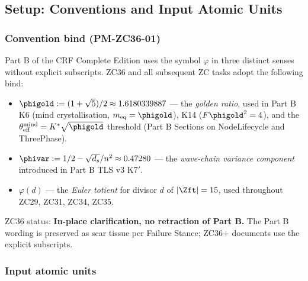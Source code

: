 \documentclass[12pt, a4paper]{article}
\begin{document}
\tableofcontents
\newpage

\subsection{Setup: Conventions and Input Atomic Units}
\label{sec:setup}

\subsubsection{Convention bind (PM-ZC36-01)}

\begin{keybox}[title={PM-ZC36-01: Symbol bind for $\varphi$ in Part B}]
Part B of the CRF Complete Edition uses the symbol $\varphi$
in three distinct senses without explicit subscripts. ZC36 and
all subsequent ZC tasks adopt the following bind:
\begin{itemize}[leftmargin=*, noitemsep]
  \item $\phigold := (1+\sqrt{5})/2 \approx 1.6180339887$
        --- the \emph{golden ratio}, used in Part B
        K6 (mind crystallisation, $m_{\rm eq} = \phigold$),
        K14 ($F\phigold^2 = 4$), and the
        $\theta_{\rm eff}^{\rm mind} = K^*\sqrt{\phigold}$
        threshold (Part B Sections on NodeLifecycle and
        ThreePhase).
  \item $\phivar := 1/2 - \sqrt{d_s}/n^2 \approx 0.47280$
        --- the \emph{wave-chain variance component} introduced
        in Part B TLS v3 K7$'$.
  \item $\varphi(d)$ --- the \emph{Euler totient} for divisor
        $d$ of $|\Zft| = 15$, used throughout ZC29, ZC31,
        ZC34, ZC35.
\end{itemize}
ZC36 status: \textbf{In-place clarification, no retraction
of Part B.} The Part B wording is preserved as scar tissue
per Failure Stance; ZC36+ documents use the explicit
subscripts.
\end{keybox}

\subsubsection{Input atomic units}
\end{document}
